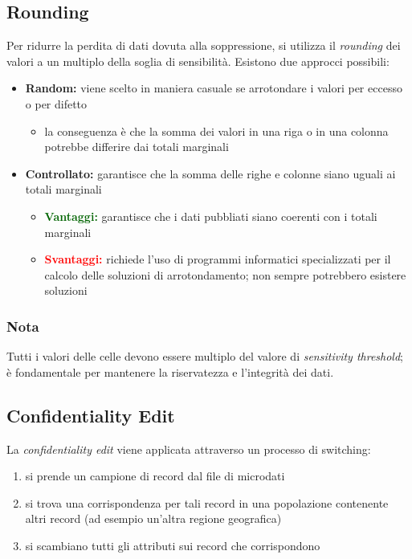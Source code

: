\documentclass{report}
\begin{document}
\subsection{Rounding}
Per ridurre la perdita di dati dovuta alla soppressione, si utilizza il \textit{rounding} 
dei valori a un multiplo della soglia di sensibilità. Esistono due approcci possibili:
\begin{itemize}
    \item \textbf{Random:} viene scelto in maniera casuale se arrotondare i valori per eccesso o per difetto 
    \begin{itemize}
        \item la conseguenza è che la somma dei valori in una riga o in una colonna 
        potrebbe differire dai totali marginali
    \end{itemize}
    \item \textbf{Controllato:} garantisce che la somma delle righe e colonne siano uguali 
    ai totali marginali
    \begin{itemize}
        \item \textbf{\textcolor{darkgreen}{Vantaggi:}} garantisce che i dati pubbliati siano coerenti con i totali marginali
        \item \textbf{\textcolor{red}{Svantaggi:}} richiede l'uso di programmi informatici specializzati per il calcolo delle soluzioni di arrotondamento; non sempre potrebbero esistere soluzioni
    \end{itemize}
\end{itemize}

\subsubsection{Nota}
Tutti i valori delle celle devono essere multiplo del valore di \textit{sensitivity threshold}; è 
fondamentale per mantenere la riservatezza e l'integrità dei dati.


\subsection{Confidentiality Edit}
La \textit{confidentiality edit} viene applicata attraverso un processo di switching:
\begin{enumerate}
    \item si prende un campione di record dal file di microdati
    \item si trova una corrispondenza per tali record in una popolazione contenente altri record (ad esempio un'altra regione geografica)
    \item si scambiano tutti gli attributi sui record che corrispondono
\end{enumerate}
\end{document}
